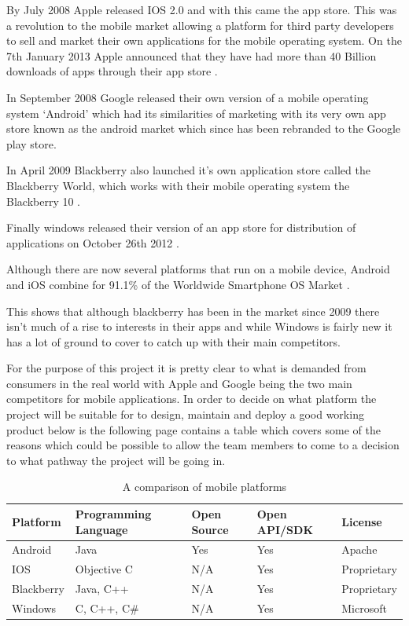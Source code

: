By July 2008 Apple released IOS 2.0 and with this came the app store. This was a
revolution to the mobile market allowing a platform for third party developers
to sell and market their own applications for the mobile operating system. On
the 7th January 2013 Apple announced that they have had more than 40 Billion
downloads of apps through their app store \citep{40billion12}.

In September 2008 Google released their own version of a mobile operating system
‘Android’ which had its similarities of marketing with its very own app store
known as the android market which since has been rebranded to the Google play
store.

In April 2009 Blackberry also launched it’s own application store called the
Blackberry World, which works with their mobile operating system the Blackberry
10 \citep{bbworld09}.

Finally windows released their version of an app store for distribution of
applications on October 26th 2012 \citep{windows8}.

Although there are now several platforms that run on a mobile device, Android
and iOS combine for 91.1\% of the Worldwide Smartphone OS Market \citep{idc13}.

This shows that although blackberry has been in the market since 2009 there
isn’t much of a rise to interests in their apps and while Windows is fairly new
it has a lot of ground to cover to catch up with their main competitors.

For the purpose of this project it is pretty clear to what is demanded from
consumers in the real world with Apple and Google being the two main competitors
for mobile applications. In order to decide on what platform the project will be
suitable for to design, maintain and deploy a good working product below is the
following page contains a table which covers some of the reasons which could be
possible to allow the team members to come to a decision to what pathway the
project will be going in.

\begin{table}[H]
    \centering
    \small
    \begin{tabular}{|p{2cm}|p{3cm}|p{2cm}|p{2.5cm}|p{2.5cm}|}
    \hline
    \textbf{Platform} & \textbf{Programming Language} & \textbf{Open Source} &
    \textbf{Open API/SDK} & \textbf{License} \\ \hline
    Android & Java & Yes & Yes & Apache \\ \hline
    IOS & Objective C & N/A & Yes & Proprietary \\ \hline
    Blackberry & Java, C++ & N/A & Yes & Proprietary \\ \hline
    Windows & C, C++, C\#& N/A & Yes & Microsoft \\ \hline 
    \end{tabular}
    \caption {A comparison of mobile platforms}
\end{table}


